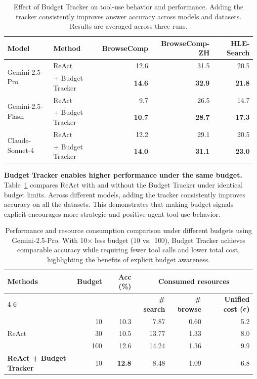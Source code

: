 \begin{table}[ht]
\centering
\caption{Effect of Budget Tracker on tool-use behavior and performance. 
Adding the tracker consistently improves answer accuracy  across models and datasets. Results are averaged across three runs.}\label{tab:react_bab}
\begin{tabular}{llrrr}
\toprule
\textbf{Model} & \textbf{Method} & \textbf{BrowseComp} & \textbf{BrowseComp-ZH} & \textbf{HLE-Search} \\
\midrule
\multirow{2}{*}{Gemini-2.5-Pro} 
& ReAct & 12.6 & 31.5 & 20.5\\
& + Budget Tracker & \textbf{14.6}  & \textbf{32.9} & \textbf{21.8}\\
\midrule
\multirow{2}{*}{Gemini-2.5-Flash} 
& ReAct & 9.7 & 26.5 & 14.7\\
& + Budget Tracker & \textbf{10.7}  & \textbf{28.7} & \textbf{17.3} \\
\midrule
\multirow{2}{*}{Claude-Sonnet-4} 
& ReAct & 12.2 & 29.1 & 20.5 \\
& + Budget Tracker & \textbf{14.0}  & \textbf{31.1} & \textbf{23.0} \\
\bottomrule
\end{tabular}
\end{table}

\textbf{Budget Tracker enables higher performance under the same budget.}
Table~\ref{tab:react_bab} compares ReAct with and without the Budget Tracker under identical budget limits. Across different models, adding the tracker consistently improves accuracy on all the datasets.  This demonstrates that making budget signals explicit encourages more strategic and positive agent tool-use behavior.



\begin{table}[t]
\centering
\caption{Performance and resource consumption comparison under different budgets using Gemini-2.5-Pro. With 10$\times$ less budget (10 vs.\ 100), Budget Tracker achieves comparable accuracy while requiring fewer tool calls and lower total cost, highlighting the benefits of explicit budget awareness.}
\label{tab:react_less_cost}
\begin{tabular}{lrrrrr}
\toprule
\multirow{2}{*}{\textbf{Methods}} & 
\multirow{2}{*}{\textbf{Budget}} & 
\multirow{2}{*}{\textbf{Acc (\%)}} &
\multicolumn{3}{c}{\textbf{Consumed resources}} \\ 
\cmidrule(lr){4-6}
 &  &  & \textbf{\# search} & \textbf{\# browse} & \textbf{Unified cost (¢)} \\
\midrule
\multirow{3}{*}{ReAct} 
 & 10  & 10.3 & 7.87  & 0.60 & 5.2 \\
 & 30  & 10.5 & 13.77 & 1.33 & 8.0 \\
 & 100 & 12.6 & 14.24 & 1.36 & 9.9 \\
\midrule
\textbf{ReAct + Budget Tracker} & 10 & \textbf{12.8} & 8.48 & 1.09 & 6.8 \\
\bottomrule
\end{tabular}
\end{table}

